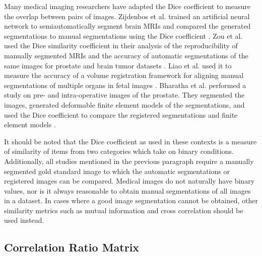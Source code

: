 Many medical imaging researchers have adapted the Dice coefficient to measure the overlap between pairs of images. %
Zijdenbos et al. trained an artificial neural network to semiautomatically segment brain MRIs and compared the generated segmentations to manual segmentations using the Dice coefficient \cite{Zijdenbos1994}.
Zou et al. used the Dice similarity coefficient in their analysis of the reproducibility of manually segmented MRIs and the accuracy of automatic segmentations of the same images for prostate and brain tumor datasets \cite{Zou2004}. 
Liao et al. used it to measure the accuracy of a volume registration framework for aligning manual segmentations of multiple organs in fetal images \cite{Liao2016}. Bharatha et al. performed a study on pre- and intra-operative images of the prostate. They segmented the images, generated deformable finite element models of the segmentations, and used the Dice coefficient to compare the registered segmentations and finite element models \cite{Bharatha2001}.


It should be noted that the Dice coefficient as used in these contexts is a measure of similarity of items from two categories which take on binary conditions. Additionally, all studies mentioned in the previous paragraph require a manually segmented gold standard image to which the automatic segmentations or registered images can be compared. Medical images do not naturally have binary values, nor is it always reasonable to obtain manual segmentations of all images in a dataset. In cases where a good image segmentation cannot be obtained, other similarity metrics such as mutual information and cross correlation should be used instead.

\subsection{Correlation Ratio Matrix}

